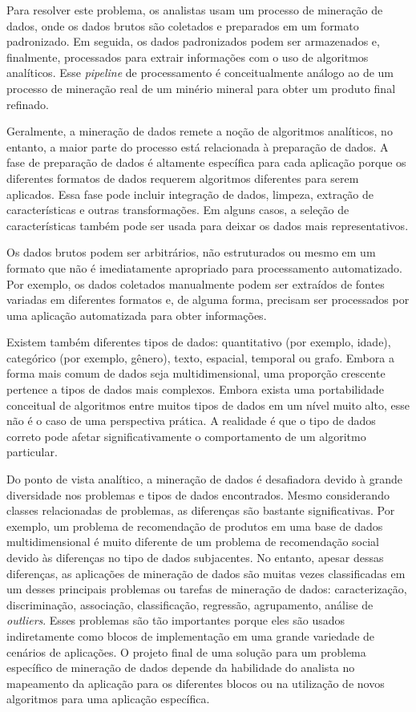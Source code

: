 Para resolver este problema, os analistas usam um processo de mineração de dados, onde os dados brutos são coletados e preparados em um formato padronizado. Em seguida, os dados padronizados podem ser armazenados e, finalmente, processados para extrair informações com o uso de algoritmos analíticos. Esse \textit{pipeline} de processamento é conceitualmente análogo ao de um processo de mineração real de um minério mineral para obter um produto final refinado.

Geralmente, a mineração de dados remete a noção de algoritmos analíticos, no entanto, a maior parte do processo está relacionada à preparação de dados. A fase de preparação de dados é altamente específica para cada aplicação porque os diferentes formatos de dados requerem algoritmos diferentes para serem aplicados. Essa fase pode incluir integração de dados, limpeza, extração de características e outras transformações. Em alguns casos, a seleção de características também pode ser usada para deixar os dados mais representativos.

Os dados brutos podem ser arbitrários, não estruturados ou mesmo em um formato que não é imediatamente apropriado para processamento automatizado. Por exemplo, os dados coletados manualmente podem ser extraídos de fontes variadas em diferentes formatos e, de alguma forma, precisam ser processados por uma aplicação automatizada para obter informações.

Existem também diferentes tipos de dados: quantitativo (por exemplo, idade), categórico (por exemplo, gênero), texto, espacial, temporal ou grafo. Embora a forma mais comum de dados seja multidimensional, uma proporção crescente pertence a tipos de dados mais complexos. Embora exista uma portabilidade conceitual de algoritmos entre muitos tipos de dados em um nível muito alto, esse não é o caso de uma perspectiva prática. A realidade é que o tipo de dados correto pode afetar significativamente o comportamento de um algoritmo particular.

Do ponto de vista analítico, a mineração de dados é desafiadora devido à grande diversidade nos problemas e tipos de dados encontrados. Mesmo considerando classes relacionadas de problemas, as diferenças são bastante significativas. Por exemplo, um problema de recomendação de produtos em uma base de dados multidimensional é muito diferente de um problema de recomendação social devido às diferenças no tipo de dados subjacentes. No entanto, apesar dessas diferenças, as aplicações de mineração de dados são muitas vezes classificadas em um desses principais problemas ou tarefas de mineração de dados: caracterização, discriminação, associação, classificação, regressão, agrupamento, análise de \textit{outliers}. Esses problemas são tão importantes porque eles são usados indiretamente como blocos de implementação em uma grande variedade de cenários de aplicações. O projeto final de uma solução para um problema específico de mineração de dados depende da habilidade do analista no mapeamento da aplicação para os diferentes blocos ou na utilização de novos algoritmos para uma aplicação específica.

